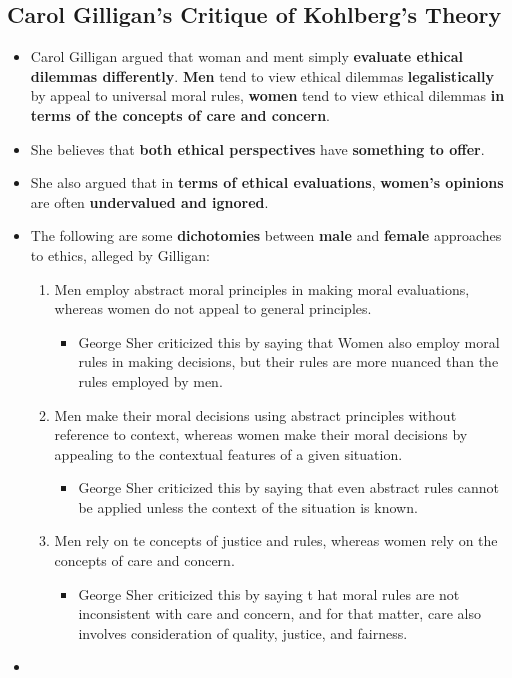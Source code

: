\documentclass[16pt]{article}
\begin{document}
    \subsection*{Carol Gilligan's Critique of Kohlberg's Theory}
    \begin{itemize}
        \item Carol Gilligan argued that woman and ment simply \textbf{evaluate ethical dilemmas differently}. \textbf{Men} tend to view ethical dilemmas \textbf{legalistically} by appeal to universal moral rules, \textbf{women} tend to view ethical dilemmas \textbf{in terms of the concepts of care and concern}.
        \item She believes that \textbf{both ethical perspectives} have \textbf{something to offer}.
        \item She also argued that in \textbf{terms of ethical evaluations}, \textbf{women's opinions} are often \textbf{undervalued and ignored}.
        \item The following are some \textbf{dichotomies} between \textbf{male} and \textbf{female} approaches to ethics, alleged by Gilligan:
        \begin{enumerate}
            \item Men employ abstract moral principles in making moral evaluations, whereas women do not appeal to general principles.
            \begin{itemize}
                \item George Sher criticized this by saying that Women also employ moral rules in making decisions, but their rules are more nuanced than the rules employed by men.
            \end{itemize}
            \item Men make their moral decisions using abstract principles without reference to context, whereas women make their moral decisions by appealing to the contextual features of a given situation.
            \begin{itemize}
                \item George Sher criticized this by saying that even abstract rules cannot be applied unless the context of the situation is known.
            \end{itemize}
            \item Men rely on te concepts of justice and rules, whereas women rely on the concepts of care and concern.
            \begin{itemize}
                \item George Sher criticized this by saying t hat moral rules are not inconsistent with care and concern, and for that matter, care also involves consideration of quality, justice, and fairness.
            \end{itemize} 
        \end{enumerate}
        \item 
    \end{itemize}
\end{document}
